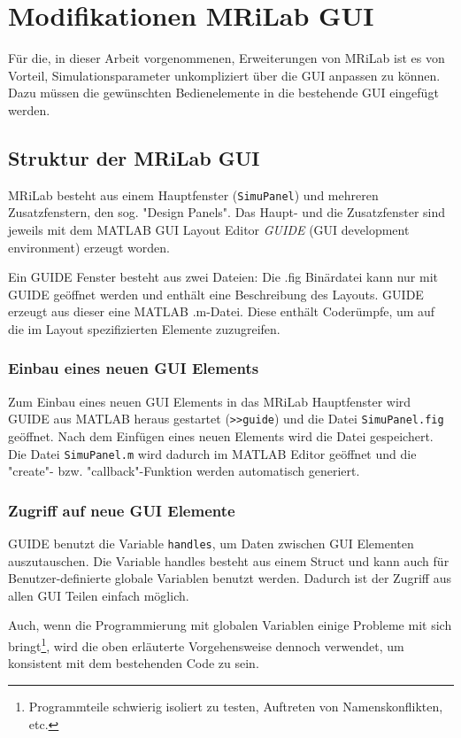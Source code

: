 \section{Modifikationen MRiLab GUI}%
Für die, in dieser Arbeit vorgenommenen, Erweiterungen von MRiLab ist es von Vorteil, Simulationsparameter unkompliziert über die GUI anpassen zu können. Dazu müssen die gewünschten Bedienelemente in die bestehende GUI eingefügt werden.

\subsection{Struktur der MRiLab GUI}
MRiLab besteht aus einem Hauptfenster (\texttt{SimuPanel}) und mehreren Zusatzfenstern, den sog. "Design Panels". Das Haupt- und die Zusatzfenster sind jeweils mit dem MATLAB GUI Layout Editor \textit{GUIDE} (GUI development environment) erzeugt worden.

Ein GUIDE Fenster besteht aus zwei Dateien: Die .fig Binärdatei kann nur mit GUIDE geöffnet werden und enthält eine Beschreibung des Layouts. GUIDE erzeugt aus dieser eine MATLAB .m-Datei. Diese enthält Coderümpfe, um auf die im Layout spezifizierten Elemente zuzugreifen.

\subsubsection{Einbau eines neuen GUI Elements}
Zum Einbau eines neuen GUI Elements in das MRiLab Hauptfenster wird GUIDE aus MATLAB heraus gestartet (\texttt{>>guide}) und die Datei \texttt{SimuPanel.fig} geöffnet. Nach dem Einfügen eines neuen Elements wird die Datei gespeichert. Die Datei \texttt{SimuPanel.m} wird dadurch im MATLAB Editor geöffnet und die "create"- bzw. "callback"-Funktion werden automatisch generiert.

\subsubsection{Zugriff auf neue GUI Elemente}
GUIDE benutzt die Variable \texttt{handles}, um Daten zwischen GUI Elementen auszutauschen. Die Variable handles besteht aus einem Struct und kann auch für Benutzer-definierte globale Variablen benutzt werden. Dadurch ist der Zugriff aus allen GUI Teilen einfach möglich.

Auch, wenn die Programmierung mit globalen Variablen einige Probleme mit sich bringt\footnote{Programmteile schwierig isoliert zu testen, Auftreten von Namenskonflikten, etc.}, wird die oben erläuterte Vorgehensweise dennoch verwendet, um konsistent mit dem bestehenden Code zu sein.

